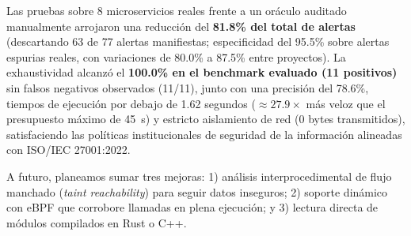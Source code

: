 \documentclass[conference]{IEEEtran}
\begin{document}
Las pruebas sobre 8 microservicios reales frente a un oráculo auditado manualmente arrojaron una reducción del \textbf{81.8\% del total de alertas} (descartando 63 de 77 alertas manifiestas; especificidad del 95.5\% sobre alertas espurias reales, con variaciones de 80.0\% a 87.5\% entre proyectos). La exhaustividad alcanzó el \textbf{100.0\% en el benchmark evaluado (11 positivos)} sin falsos negativos observados (11/11), junto con una precisión del 78.6\%, tiempos de ejecución por debajo de 1.62 segundos ($\approx 27.9\times$ más veloz que el presupuesto máximo de 45~s) y estricto aislamiento de red (0 bytes transmitidos), satisfaciendo las políticas institucionales de seguridad de la información alineadas con ISO/IEC 27001:2022.

A futuro, planeamos sumar tres mejoras: 1) análisis interprocedimental de flujo manchado (\textit{taint reachability}) para seguir datos inseguros; 2) soporte dinámico con eBPF que corrobore llamadas en plena ejecución; y 3) lectura directa de módulos compilados en Rust o C++.



\end{document}
